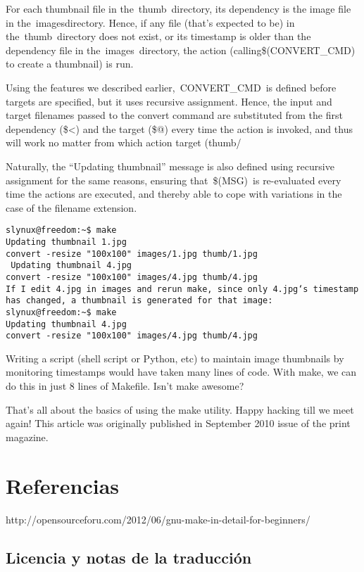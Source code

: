 \documentclass[12pt]{article}
\begin{document}
For each thumbnail file in the thumb directory, its dependency is the image file in the imagesdirectory. Hence, if any file (that’s expected to be) in the thumb directory does not exist, or its timestamp is older than the dependency file in the images directory, the action (calling\$(CONVERT\_CMD) to create a thumbnail) is run.

Using the features we described earlier, CONVERT\_CMD is defined before targets are specified, but it uses recursive assignment. Hence, the input and target filenames passed to the convert command are substituted from the first dependency (\$<) and the target (\$@) every time the action is invoked, and thus will work no matter from which action target (thumb/%

Naturally, the “Updating thumbnail” message is also defined using recursive assignment for the same reasons, ensuring that \$(MSG) is re-evaluated every time the actions are executed, and thereby able to cope with variations in the case of the filename extension.

\begin{verbatim}
slynux@freedom:~$ make
Updating thumbnail 1.jpg
convert -resize "100x100" images/1.jpg thumb/1.jpg
 Updating thumbnail 4.jpg
convert -resize "100x100" images/4.jpg thumb/4.jpg
If I edit 4.jpg in images and rerun make, since only 4.jpg‘s timestamp has changed, a thumbnail is generated for that image:
slynux@freedom:~$ make
Updating thumbnail 4.jpg
convert -resize "100x100" images/4.jpg thumb/4.jpg
\end{verbatim}

Writing a script (shell script or Python, etc) to maintain image thumbnails by monitoring timestamps would have taken many lines of code. With make, we can do this in just 8 lines of Makefile. Isn’t make awesome?

That’s all about the basics of using the make utility. Happy hacking till we meet again!
This article was originally published in September 2010 issue of the print magazine.






\section*{Referencias}

http://opensourceforu.com/2012/06/gnu-make-in-detail-for-beginners/

\subsection*{Licencia y notas de la traducción}
\end{document}
